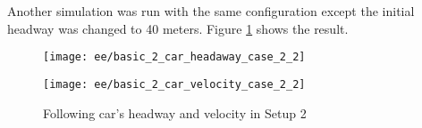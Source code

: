	Another simulation was run with the same configuration except the initial headway was changed to 40 meters. Figure \ref{fig:basic2car_case_2} shows the result.
	\begin{figure}
		\centering
		\begin{minipage}{.5\textwidth}
			\centering
			\texttt{[image: ee/basic\_2\_car\_headaway\_case\_2\_2]}
		\end{minipage}\hfill
		\begin{minipage}{.5\textwidth}
			\centering
			\texttt{[image: ee/basic\_2\_car\_velocity\_case\_2\_2]}
		\end{minipage}
		\caption{Following car's headway and velocity in Setup 2}
		\label{fig:basic2car_case_2}
	\end{figure}
